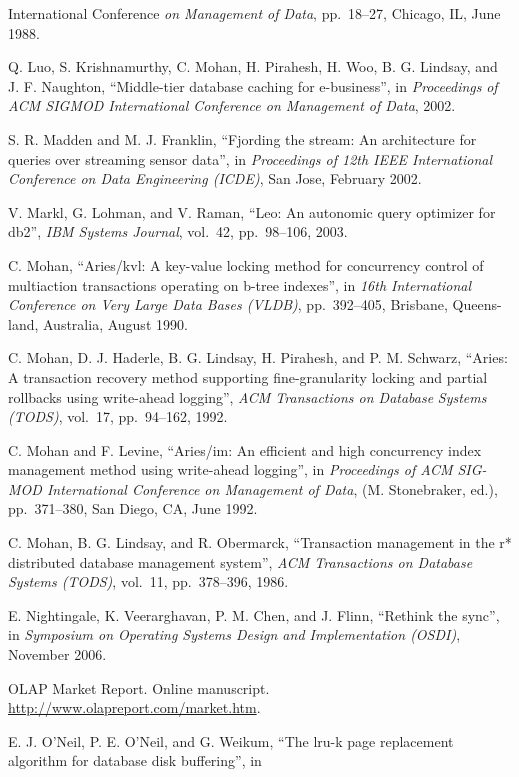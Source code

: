 \documentclass[b5paper,11pt,twoside,openright]{book}
\begin{document}
\begin{enumerate}[label={[\arabic*]}]
{  International Conference} \emph{on Management of Data}, pp.~18--27,
  Chicago, IL, June 1988.
\item
  Q. Luo, S. Krishnamurthy, C. Mohan, H. Pirahesh, H. Woo, B. G.
  Lindsay, and J. F. Naughton, ``Middle-tier database caching for
  e-business'', in \emph{Proceedings} \emph{of ACM SIGMOD International
  Conference on Management of Data}, 2002.
\item
  S. R. Madden and M. J. Franklin, ``Fjording the stream: An
  architecture for queries over streaming sensor data'', in
  \emph{Proceedings of 12th IEEE International} \emph{Conference on Data
  Engineering (ICDE)}, San Jose, February 2002.
\item
  V. Markl, G. Lohman, and V. Raman, ``Leo: An autonomic query optimizer
  for db2'', \emph{IBM Systems Journal}, vol.~42, pp.~98--106, 2003.
\item
  C. Mohan, ``Aries/kvl: A key-value locking method for concurrency
  control of multiaction transactions operating on b-tree indexes'', in
  \emph{16th International} \emph{Conference on Very Large Data Bases
  (VLDB)}, pp.~392--405, Brisbane, Queens-land, Australia, August 1990.
\item
  C. Mohan, D. J. Haderle, B. G. Lindsay, H. Pirahesh, and P. M.
  Schwarz, ``Aries: A transaction recovery method supporting
  fine-granularity locking and partial rollbacks using write-ahead
  logging'', \emph{ACM Transactions on Database} \emph{Systems (TODS)},
  vol.~17, pp.~94--162, 1992.
\item
  C. Mohan and F. Levine, ``Aries/im: An efficient and high concurrency
  index management method using write-ahead logging'', in
  \emph{Proceedings of ACM SIG-MOD International Conference on
  Management of Data}, (M. Stonebraker, ed.), pp.~371--380, San Diego,
  CA, June 1992.
\item
  C. Mohan, B. G. Lindsay, and R. Obermarck, ``Transaction management in
  the r* distributed database management system'', \emph{ACM
  Transactions on Database} \emph{Systems (TODS)}, vol.~11,
  pp.~378--396, 1986.
\item
  E. Nightingale, K. Veerarghavan, P. M. Chen, and J. Flinn, ``Rethink
  the sync'', in \emph{Symposium on Operating Systems Design and
  Implementation (OSDI)}, November 2006.
\item
  OLAP Market Report. Online manuscript.
  \url{http://www.olapreport.com/market.htm}.
\item
  E. J. O'Neil, P. E. O'Neil, and G. Weikum, ``The lru-k page
  replacement algorithm for database disk buffering'', in

\end{enumerate}
\end{document}
